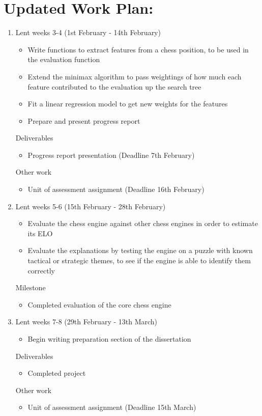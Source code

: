 \documentclass[12pt,a4paper]{article}
\begin{document}
\section*{Updated Work Plan:}
\begin{enumerate}
    \item Lent weeks 3-4 (1st February - 14th February)
    \begin{itemize}
        \item Write functions to extract features from a chess position, to be used in the evaluation function
        \item Extend the minimax algorithm to pass weightings of how much each feature contributed to the evaluation up the search tree
        \item Fit a linear regression model to get new weights for the features
        \item Prepare and present progress report
    \end{itemize}
    Deliverables
    \begin{itemize}
        \item Progress report presentation (Deadline 7th February)
    \end{itemize}
    Other work
    \begin{itemize}
        \item Unit of assessment assignment (Deadline 16th February)
    \end{itemize}

    \item Lent weeks 5-6 (15th February - 28th February)
    \begin{itemize}
        \item Evaluate the chess engine against other chess engines in order to estimate its ELO
        \item Evaluate the explanations by testing the engine on a puzzle with known tactical or strategic themes, to see if the engine is able to identify them correctly
    \end{itemize}
    Milestone
    \begin{itemize}
        \item Completed evaluation of the core chess engine
    \end{itemize}

    \item Lent weeks 7-8 (29th February - 13th March)
    \begin{itemize}
        \item Begin writing preparation section of the dissertation
    \end{itemize}
    Deliverables
    \begin{itemize}
        \item Completed project
    \end{itemize}
    Other work
    \begin{itemize}
        \item Unit of assessment assignment (Deadline 15th March)
    \end{itemize}


\end{enumerate}
\end{document}
